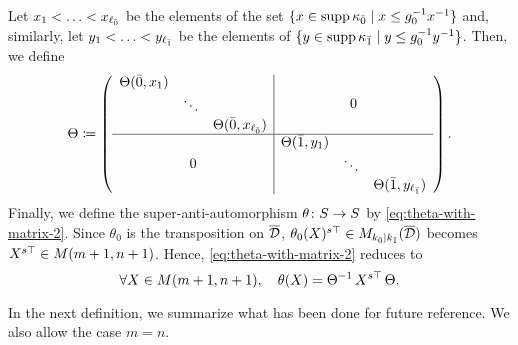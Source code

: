 Let $x_1 < \ldots < x_{\ell_{\bar{0}}}$ be the elements of the set $\{ x \in \operatorname{supp} \kappa_{\bar{0}} \mid x \leq g_0^{-1} x^{-1} \}$ and, similarly, let $y_1 < \ldots < y_{\ell_{\bar{1}}}$ be the elements of $\{ y \in \operatorname{supp} \kappa_{\bar{1}} \mid y \leq g_0^{-1} y^{-1} \}$. 
Then, we define 
\[\label{eq:puting-the-blocks-of-Phi-together-version-A}
    \sbox0{$\begin{matrix}
        \Theta(\bar 0, x_1)&& \\
        & \ddots &\\
        && \Theta(\bar 0, x_{\ell_\bz})
    \end{matrix}$}
    \sbox1{$\begin{matrix}
        \Theta(\bar 1, y_1)&& \\
        & \ddots &\\
        && \Theta(\bar 1, y_{\ell_\bo})
    \end{matrix}$}
    \Theta \coloneqq
    \left(\begin{array}{c|c}
            \usebox{0} & 0\\
            \hline
            0 & \usebox{1}
        \end{array}\right).
\]
%
Finally, we define the super-anti-automorphism $\theta\colon S\to S$ by \cref{eq:theta-with-matrix-2}. 
Since $\theta_0$ is the transposition on $\barr \D$, $\theta_0(X)\stransp \in M_{k_\bz \mid k_\bo} (\barr \D)$ becomes $X^{s\top} \in M(m+1,n+1)$. 
Hence, \cref{eq:theta-with-matrix-2} reduces to 
\[\label{eq:theta-with-matrix-3}
    \forall X\in M(m+1,n+1), \quad \theta(X) = \Theta^{-1}\, X^{s\top}\, \Theta.
\]

In the next definition, we summarize what has been done for future reference. 
We also allow the case $m=n$.

